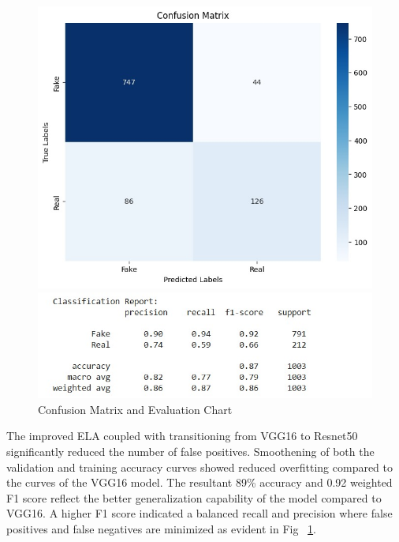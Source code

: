 \documentclass{ieeeaccess}
\begin{document}
 
 \begin{figure}[h!]
 	\centering
 	\begin{minipage}{0.32\textwidth}
 		\centering
 		\includegraphics[width=\linewidth]{Confusion_Matrix.jpg}
 	\end{minipage}
 	\hfill
 	\begin{minipage}{0.32\textwidth}
 		\centering
 		\includegraphics[width=\linewidth]{Chart_EM.jpg}
 		
 	\end{minipage}
 	\caption{Confusion Matrix and Evaluation Chart}
 	\label{fig:Confusion Matrix}
 \end{figure}
 The improved ELA coupled with transitioning from VGG16 to Resnet50 significantly reduced the number of false positives. Smoothening of both the validation and training accuracy curves showed reduced overfitting compared to the curves of the VGG16 model. The resultant 89\% accuracy and 0.92 weighted F1 score reflect the better generalization capability of the model compared to VGG16. A higher F1 score indicated a balanced recall and precision where false positives and false negatives are minimized as evident in Fig ~\ref{fig:Confusion Matrix}. 
 
\end{document}
